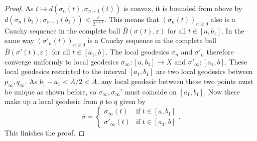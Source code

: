 \documentclass[10pt,a4paper]{amsart}
\begin{document}
\begin{proof}
As \(t\mapsto d(\sigma_n(t),\sigma_{n+1}(t))\) is convex, it is bounded from above by \(d(\sigma_n(b_1),\sigma_{n+1}(b_1))<\frac{\varepsilon}{2^{n+1}}\).
This means that \((\sigma_n(t))_{n\geq 0}\) also is a Cauchy sequence in the complete ball \(\overline{B}(\sigma(t),\varepsilon)\) for all \(t\in [a,b_1]\).
In the same way \((\sigma'_n(t))_{n\geq 0}\) is a Cauchy sequence in the complete ball \(\overline{B}(\sigma'(t),\varepsilon)\) for all \(t\in [a_1,b]\).
The local geodesics \(\sigma_n\) and \(\sigma'_n\) therefore converge uniformly to local geodesics \(\sigma_\infty:[a,b_1]\to X\) and \(\sigma'_\infty:[a_1,b]\).
These local geodesics restricted to the interval \([a_1,b_1]\) are two local geodesics between \(p_\infty,q_\infty\).
As \(b_1-a_1<A/2<A\), any local geodesic between these two points must be unique as shown before, so \(\sigma_\infty,\sigma_\infty'\) must coincide on \([a_1,b_1]\).
Now these make up a local geodesic from \(\overline{p}\) to \(\overline{q}\) given by
\[\overline{\sigma}=\begin{cases}
\sigma_\infty(t)   &\text{if }t\in [a,b_1]\\
\sigma'_\infty(t)   &\text{if }t\in[a_1,b]\end{cases}.\]
This finishes the proof.
\end{proof}
\end{document}
